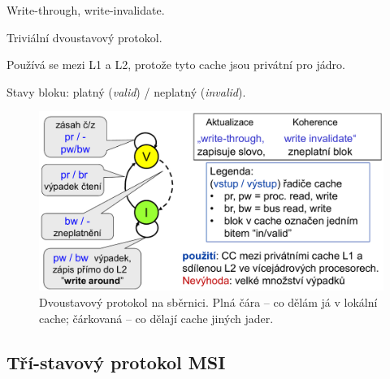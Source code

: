 \begin{compactitem}
    \item Write-through, write-invalidate.
    \item Triviální dvoustavový protokol.
    \item Používá se mezi L1 a L2, protože tyto cache jsou privátní pro jádro.
    \item Stavy bloku: platný (\textit{valid}) / neplatný (\textit{invalid}).

    \begin{figure}[H]
        \centering
        \includegraphics[width=0.9\linewidth]{dvoustavovy.pdf}
        \caption{Dvoustavový protokol na sběrnici. Plná čára -- co dělám já v lokální cache; čárkovaná -- co dělají cache jiných jader.}
    \end{figure}
\end{compactitem}

\subsection{Tří-stavový protokol MSI}

